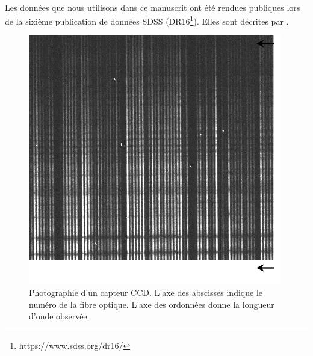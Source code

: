 \paragraph{}
Les données que nous utilisons dans ce manuscrit ont été rendues publiques lors de la sixième publication de données SDSS (DR16\footnote{https://www.sdss.org/dr16/}). Elles sont décrites par \textcite{Ahumada2019}.
\begin{figure}[b]
  \centering
  \includegraphics[scale=1]{photo_ccd.pdf}
  \caption{Photographie d'un capteur CCD. L'axe des abscisses indique le numéro de la fibre optique. L'axe des ordonnées donne la longueur d'onde observée.}
  \label{fig:photo_ccd}
\end{figure}

